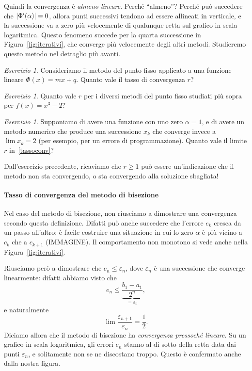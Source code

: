 \documentclass[a4paper]{report}
\DeclarePairedDelimiter{\abs}{\lvert}{\rvert}
\theoremstyle{definiton}
\theoremstyle{remark}
\newtheorem{esercizio}[theorem]{Esercizio}
\begin{document}
Quindi la convergenza è \emph{almeno lineare}. Perché ``almeno''? Perché può succedere che $\abs{\Phi'(\alpha)} = 0$, allora punti successivi tendono ad essere allineati in verticale, e la successione va a zero più velocemente di qualunque retta sul grafico in scala logaritmica. Questo fenomeno succede per la quarta successione in Figura~\ref{fig:iterativi}, che converge più velocemente degli altri metodi. Studieremo questo metodo nel dettaglio più avanti.

\begin{esercizio}
    Consideriamo il metodo del punto fisso applicato a una funzione lineare $\Phi(x) = mx + q$. Quanto vale il tasso di convergenza $r$?
\end{esercizio}
\begin{esercizio}
    Quanto vale $r$ per i diversi metodi del punto fisso studiati più sopra per $f(x) = x^3 - 2$?
\end{esercizio}
\begin{esercizio}
    Supponiamo di avere una funzione con uno zero $\alpha = 1$, e di avere un metodo numerico che produce una successione $x_k$ che converge invece a $\lim x_k = 2$ (per esempio, per un errore di programmazione). Quanto vale il limite $r$ in~\eqref{tassoconv}?
\end{esercizio}
Dall'esercizio precedente, ricaviamo che $r \geq 1$ può essere un'indicazione che il metodo non sta convergendo, o sta convergendo alla soluzione sbagliata!

\paragraph{Tasso di convergenza del metodo di bisezione}

Nel caso del metodo di bisezione, non riusciamo a dimostrare una convergenza secondo questa definizione. Difatti può anche succedere che l'errore $e_k$ cresca da un passo all'altro: è facile costruire una situazione in cui lo zero $\alpha$ è più vicino a $c_k$ che a $c_{k+1}$ (IMMAGINE). Il comportamento non monotono si vede anche nella Figura~\ref{fig:iterativi}.

Riusciamo però a dimostrare che $e_n \leq \varepsilon_n$, dove $\varepsilon_n$ è una successione che converge linearmente: difatti abbiamo visto che
\[
e_n \leq \underbrace{\frac{b_1 - a_1}{2^n}}_{=\varepsilon_n},
\]
e naturalmente
\[
\lim \frac{\varepsilon_{n+1}}{\varepsilon_n} = \frac{1}{2}.
\]
Diciamo allora che il metodo di bisezione ha \emph{convergenza pressoché lineare}. Su un grafico in scala logaritmica, gli errori $e_n$ stanno al di sotto della retta data dai punti $\varepsilon_n$, e solitamente non se ne discostano troppo. Questo è confermato anche dalla nostra figura.
\end{document}

